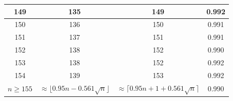 \begin{table}
\begin{tabular}{|c|c|c|c|}
 149  & 135  & 149 & 0.992  \\ \hline
 150  & 136  & 150 & 0.991  \\ \hline
 151  & 137  & 151 & 0.991  \\ \hline
 152  & 138  & 152 & 0.990  \\ \hline
 153  & 138  & 152 & 0.992  \\ \hline
 154  & 139  & 153 & 0.992  \\ \hline
\hline $n \geq 155$ &
\multicolumn{1}{p{20mm}|}{$\approx \lfloor 0.95 n - 0.561 \sqrt{n}\rfloor$} &
\multicolumn{1}{p{20mm}|}{$\approx \lceil 0.95 n + 1 + 0.561 \sqrt{n}\rceil$} &
0.990 \\ \hline
\end{tabular}
 \hspace{2mm}
\end{table}
